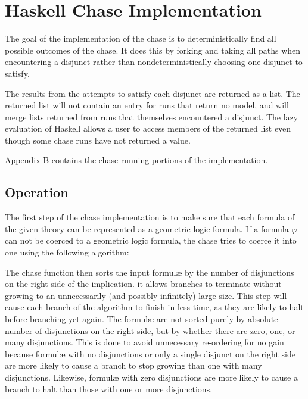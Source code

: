 \section{Haskell Chase Implementation}

	The goal of the implementation of the chase is to deterministically find
	all possible outcomes of the chase. It does this by forking and taking all
	paths when encountering a disjunct rather than nondeterministically
	choosing one disjunct to satisfy.

	The results from the attempts to satisfy each disjunct are returned as a
	list. The returned list will not contain an entry for runs that return no
	model, and will merge lists returned from runs that themselves encountered
	a disjunct. The lazy evaluation of Haskell allows a user to access members
	of the returned list even though some chase runs have not returned a value.

	Appendix B contains the chase-running portions of the implementation.

	\subsection{Operation}

	The first step of the chase implementation is to make sure that each formula
	of the given theory can be represented as a geometric logic formula. If a formula $\varphi$ can
	not be coerced to a geometric logic formula, the chase tries to coerce it into one using
	the following algorithm:

	\begin{algorithm}[H]
	\DontPrintSemicolon
	\end{algorithm}

	The chase function then sorts the input formul{\ae} by the number of
	disjunctions on the right side of the implication. it allows branches to
	terminate without growing to an unnecessarily (and possibly infinitely)
	large size. This step will cause each branch of the algorithm to finish in
	less time, as they are likely to halt before branching yet again. The
	formul{\ae} are not sorted purely by absolute number of disjunctions on the
	right side, but by whether there are zero, one, or many disjunctions. This
	is done to avoid unnecessary re-ordering for no gain because formul{\ae}
	with no disjunctions or only a single disjunct on the right side are more
	likely to cause a branch to stop growing than one with many disjunctions.
	Likewise, formul{\ae} with zero disjunctions are more likely to cause a
	branch to halt than those with one or more disjunctions.

